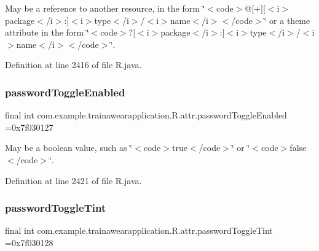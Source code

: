 May be a reference to another resource, in the form \char`\"{}$<$code$>$@\mbox{[}+\mbox{]}\mbox{[}$<$i$>$package$<$/i$>$\+:\mbox{]}$<$i$>$type$<$/i$>$/$<$i$>$name$<$/i$>$$<$/code$>$\char`\"{} or a theme attribute in the form \char`\"{}$<$code$>$?\mbox{[}$<$i$>$package$<$/i$>$\+:\mbox{]}$<$i$>$type$<$/i$>$/$<$i$>$name$<$/i$>$$<$/code$>$\char`\"{}. 

Definition at line 2416 of file R.\+java.

\mbox{\label{classcom_1_1example_1_1trainawearapplication_1_1_r_1_1attr_ae696d0e29f8d20e72b292fca840957ac}} 
\subsubsection{\texorpdfstring{passwordToggleEnabled}{passwordToggleEnabled}}
{\footnotesize\ttfamily final int com.\+example.\+trainawearapplication.\+R.\+attr.\+password\+Toggle\+Enabled =0x7f030127\hspace{0.3cm}{\ttfamily [static]}}

May be a boolean value, such as \char`\"{}$<$code$>$true$<$/code$>$\char`\"{} or \char`\"{}$<$code$>$false$<$/code$>$\char`\"{}. 

Definition at line 2421 of file R.\+java.

\mbox{\label{classcom_1_1example_1_1trainawearapplication_1_1_r_1_1attr_ad6f23b93451bdf912f87deeffd37a0a5}} 
\subsubsection{\texorpdfstring{passwordToggleTint}{passwordToggleTint}}
{\footnotesize\ttfamily final int com.\+example.\+trainawearapplication.\+R.\+attr.\+password\+Toggle\+Tint =0x7f030128\hspace{0.3cm}{\ttfamily [static]}}

